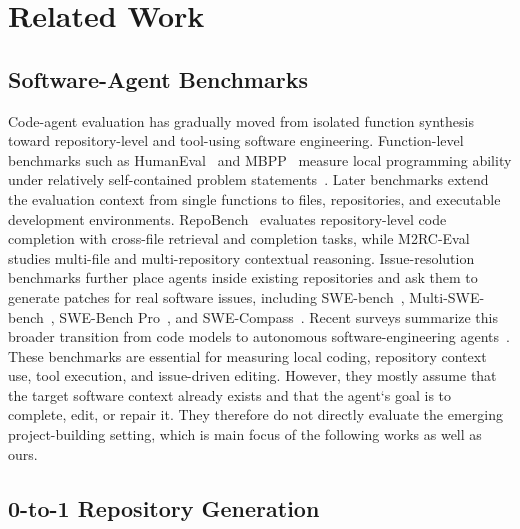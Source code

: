 \section{Related Work}
\label{sec:related-work}

\subsection{Software-Agent Benchmarks}

Code-agent evaluation has gradually moved from isolated function synthesis toward repository-level and tool-using software engineering. Function-level benchmarks such as HumanEval~\cite{chen2021codex} and MBPP~\cite{austin2021program} measure local programming ability under relatively self-contained problem statements~\cite{chen2021evaluating,austin2021programsynthesislargelanguage}. 
Later benchmarks extend the evaluation context from single functions to files, repositories, and executable development environments. 
RepoBench~\cite{liu2023repobench} evaluates repository-level code completion with cross-file retrieval and completion tasks, while M2RC-Eval~\cite{liu2025m2rc} studies multi-file and multi-repository contextual reasoning. 
Issue-resolution benchmarks further place agents inside existing repositories and ask them to generate patches for real software issues, including SWE-bench~\cite{jimenez2024swebench}, Multi-SWE-bench~\cite{zan2025multi}, SWE-Bench Pro~\cite{deng2025swe}, and SWE-Compass~\cite{xu2025swe}. 
Recent surveys summarize this broader transition from code models to autonomous software-engineering agents~\cite{llm_codegen_survey2024,llm_agents_se_survey2024,codegen_agents_survey2025}.
These benchmarks are essential for measuring local coding, repository context use, tool execution, and issue-driven editing. However, they mostly assume that the target software context already exists and that the agent`s goal is to complete, edit, or repair it. They therefore do not directly evaluate the emerging project-building setting, which is main focus of the following works as well as ours.

\subsection{0-to-1 Repository Generation}

